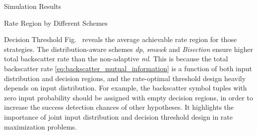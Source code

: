 \documentclass[journal,12pt,onecolumn,draftclsnofoot]{IEEEtran}
\theoremstyle{remark}
\begin{document}
\begin{section}{Simulation Results}
\begin{subsection}{Rate Region by Different Schemes}
\begin{subsubsection}{Decision Threshold}
			Fig.~ reveals the average achievable rate region for those strategies.
			The distribution-aware schemes \emph{\gls{dp}}, \emph{\gls{smawk}} and \emph{Bisection} ensure higher total backscatter rate than the non-adaptive \emph{\gls{ml}}.
			This is because the total backscatter rate \eqref{eq:backscatter_mutual_information} is a function of both input distribution and decision regions, and the rate-optimal threshold design heavily depends on input distribution.
			For example, the backscatter symbol tuples with zero input probability should be assigned with empty decision regions, in order to increase the success detection chances of other hypotheses.
			It highlights the importance of joint input distribution and decision threshold design in rate maximization problems.
		\end{subsubsection}

	\end{subsection}



\end{section}
\end{document}
